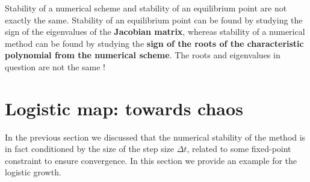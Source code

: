 \begin{remark}
Stability of a numerical scheme and stability of an equilibrium point are not exactly the same.  Stability of an equilibrium point can be found by studying the sign of the eigenvalues of the \textbf{Jacobian matrix}, whereas stability of a numerical method can be found by studying the \textbf{sign of the roots of the characteristic polynomial from the numerical scheme}. The roots and eigenvalues in question are not the same ! 
\end{remark}
\section{Logistic map: towards chaos}

In the previous section we discussed that the numerical stability of the method is in fact conditioned by the size of the step size $\Delta t$, related to some fixed-point constraint to ensure convergence. In this section we provide an example for the logistic growth.\\


